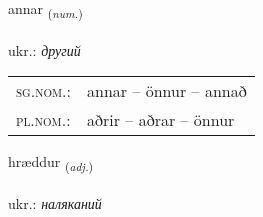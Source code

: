 \documentclass[frontgrid, backgrid]{flacards}\usepackage[]{graphicx}\usepackage[]{xcolor}
\begin{document}
\renewcommand{\flhead}{\vskip5pt \fboxsep=0pt {\small\bfseries\footnotesize Löluor�rorð | чисельник}}
\renewcommand{\fcfoot}{\vskip5pt \fboxsep=0pt \hspace{2pt}{\small\bfseries\footnotesize 2K}}

\renewcommand{\blhead}{\vskip5pt {\small\bfseries\footnotesize Löluor�rorð | чисельник }}
\renewcommand{\bcfoot}{\vskip5pt \hspace{2pt}{\small\bfseries\footnotesize 2K}}


{annar \small{\textsubscript{(\textit{num.})}} \\[1ex] %
\textphonetic{[anar]} \\
ukr.: \emph{другий} \\  [2ex]
\renewcommand*{\arraystretch}{0.8}
\begin{tabular}{ll}
\textsc{sg.nom.}: & annar  --  önnur -- annað \\ 
\textsc{pl.nom.}: & aðrir -- aðrar -- önnur
\end{tabular}
}

\renewcommand{\flhead}{\vskip5pt \fboxsep=0pt {\small\bfseries\footnotesize Lýsingarorð | прикметник}}
\renewcommand{\fcfoot}{\vskip5pt \fboxsep=0pt \hspace{2pt}{\small\bfseries\footnotesize 2K}}

\renewcommand{\blhead}{\vskip5pt {\small\bfseries\footnotesize Lýsingarorð | прикметник }}
\renewcommand{\bcfoot}{\vskip5pt \hspace{2pt}{\small\bfseries\footnotesize 2K}}


{hræddur \small{\textsubscript{(\textit{adj.})}} \\[1ex] %
\textphonetic{[r̥aitʏr]} \\
ukr.: \emph{наляканий} \\  [2ex]
\renewcommand*{\arraystretch}{0.8}
}
\end{document}
